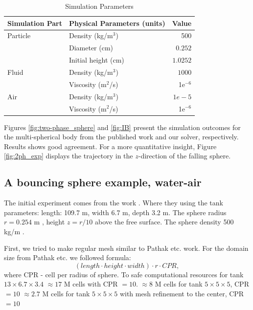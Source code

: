 \begin{table}[H]
    \centering
    \caption{Simulation Parameters} \label{table2-chap4}
    \begin{tabular}{llr}
        \toprule
        \hline
        Simulation Part         & Physical Parameters (units) & Value \\
        \hline
        \midrule
        Particle                 & Density (kg/m$^3$)          & 500    \\
                         & Diameter (cm)          & $0.252$    \\
                         & Initial height (cm)          & $1.0252$    \\
                         \hline
        Fluid                  & Density (kg/m$^3$)           & $1000$   \\
                                & Viscosity (m$^2$/s)         & 1e$^{-6}$    \\
                                \hline
         Air                  & Density (kg/m$^3$)           & $1e-5$   \\
                                & Viscosity (m$^2$/s)         & 1e$^{-6}$    \\
                                \hline
        \bottomrule
     \end{tabular}
\end{table}
Figures \ref{fig:two-phase_sphere} and \ref{fig:IB} present the simulation outcomes for the multi-spherical body from the published work and our solver, respectively. Results shows good agreement. For a more quantitative insight, Figure \ref{fig:2ph_exp} displays the trajectory in the $z$-direction of the falling sphere.

\subsection{A bouncing sphere example, water-air}
The initial experiment comes from the work \cite{beck1987transient}. Where they using the tank parameters: length: 109.7 m, width 6.7 m, depth 3.2 m. The sphere radius $r= 0.254$ m , height $z = r/10$ above the free surface. The sphere density 500 kg/m .

First, we tried to make regular mesh similar to Pathak etc.\cite{pathak20163d} work. For the domain size from Pathak etc.\cite{pathak20163d} we followed formula:
\begin{equation}
    (length \cdot height \cdot width)  \cdot  r  \cdot  CPR,
\end{equation}
where CPR - cell per radius of sphere. To safe computational resources for tank $13\times 6.7 \times 3.4$ $\approx 17$ M cells with CPR $= 10$.
 $\approx 8$ M cells for tank $5\times 5 \times 5$, CPR $= 10$
 $\approx 2.7$ M cells for tank $5\times 5 \times 5$ with mesh refinement to the center, CPR $= 10$

